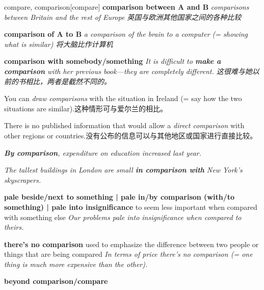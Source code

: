 \begin{DefWord}{compare, comparison}[compare]
    \textbf{comparison between A and B} \textit{comparisons between Britain and the rest of Europe 英国与欧洲其他国家之间的各种比较}

    \textbf{comparison of A to B} \textit{a comparison of the brain to a computer (= showing what is similar) 将大脑比作计算机}
 
    \textbf{comparison with somebody/something} \textit{It is difficult to \textbf{make a comparison} with her previous book—they are completely different. 这很难与她以前的书相比，两者是截然不同的。}

    You can \textit{draw comparisons} with the situation in Ireland (= say how the two situations are similar).这种情形可与爱尔兰的相比。

    There is no published information that would allow a \textit{direct comparison} with other regions or countries.没有公布的信息可以与其他地区或国家进行直接比较。

    \textit{\textbf{By comparison}, expenditure on education increased last year.}

    \textit{The tallest buildings in London are small \textbf{in comparison with} New York's skyscrapers.}

    \textbf{pale beside/next to something | pale in/by comparison (with/to something) | pale into insignificance}   
    to seem less important when compared with something else
    \textit{Our problems pale into insignificance when compared to theirs.}

    \textbf{there’s no comparison} 
    used to emphasize the difference between two people or things that are being compared
    \textit{In terms of price there's no comparison (= one thing is much more expensive than the other).}

    \textbf{beyond comparison/compare}
\end{DefWord}

